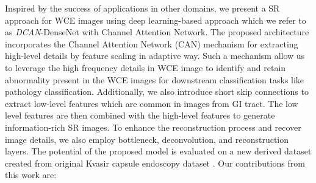 \documentclass[conference]{IEEEtran}
\begin{document}
Inspired by the success of applications in other domains, we present a SR approach for WCE images using deep learning-based approach which we refer to as \emph{DCAN}-DenseNet with Channel Attention Network. The proposed architecture incorporates the Channel Attention Network (CAN) mechanism for extracting high-level details by feature scaling in adaptive way. Such a mechanism allow us to leverage the high frequency details in WCE image to identify and retain abnormality present in the WCE images for downstream classification tasks like pathology classification. Additionally, we also introduce short skip connections to extract low-level features which are common in images from GI tract. The low level features are then combined with the high-level features to generate information-rich SR images. To enhance the reconstruction process and recover image details, we also employ bottleneck, deconvolution, and reconstruction layers. The potential of the proposed model is evaluated on a new derived dataset created from original Kvasir capsule endoscopy dataset \cite{data}. Our contributions from this work are:
\end{document}
